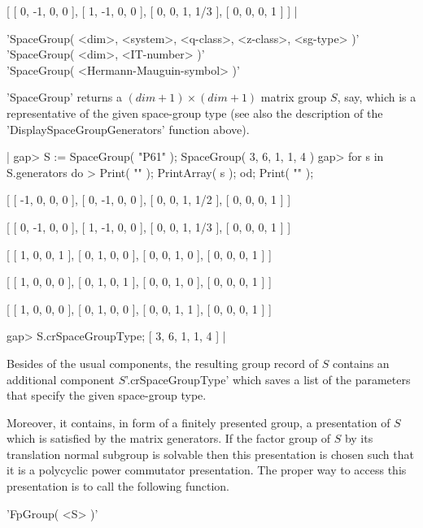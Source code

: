     [ [    0,   -1,    0,    0 ],
      [    1,   -1,    0,    0 ],
      [    0,    0,    1,  1/3 ],
      [    0,    0,    0,    1 ] ] |

\vspace{5mm}
'SpaceGroup( <dim>, <system>, <q-class>, <z-class>, <sg-type> )'%
 \\
'SpaceGroup( <dim>, <IT-number> )' \\
'SpaceGroup( <Hermann-Mauguin-symbol> )'

'SpaceGroup' returns a  $(dim+1) \times (dim+1  )$ matrix group $S$, say,
which is a  representative of the given   space-group type (see also  the
description of the 'DisplaySpaceGroupGenerators' function above).

|    gap> S := SpaceGroup( "P61" );
    SpaceGroup( 3, 6, 1, 1, 4 )
    gap> for s in S.generators do
    >  Print( "\n" ); PrintArray( s ); od; Print( "\n" );

    [ [   -1,    0,    0,    0 ],
      [    0,   -1,    0,    0 ],
      [    0,    0,    1,  1/2 ],
      [    0,    0,    0,    1 ] ]

    [ [    0,   -1,    0,    0 ],
      [    1,   -1,    0,    0 ],
      [    0,    0,    1,  1/3 ],
      [    0,    0,    0,    1 ] ]

    [ [  1,  0,  0,  1 ],
      [  0,  1,  0,  0 ],
      [  0,  0,  1,  0 ],
      [  0,  0,  0,  1 ] ]

    [ [  1,  0,  0,  0 ],
      [  0,  1,  0,  1 ],
      [  0,  0,  1,  0 ],
      [  0,  0,  0,  1 ] ]

    [ [  1,  0,  0,  0 ],
      [  0,  1,  0,  0 ],
      [  0,  0,  1,  1 ],
      [  0,  0,  0,  1 ] ]

    gap> S.crSpaceGroupType;
    [ 3, 6, 1, 1, 4 ] |

Besides  of  the usual components,   the  resulting group  record of  $S$
contains an additional component   $S$'.crSpaceGroupType' which saves   a
list of the parameters that specify the given space-group type.

Moreover, it  contains,   in  form  of a  finitely  presented  group,   a
presentation of $S$  which is satisfied  by the matrix generators. If the
factor group  of $S$ by its translation  normal subgroup is solvable then
this presentation is chosen such that it is a polycyclic power commutator
presentation. The proper way to  access this presentation  is to call the
following function.

\vspace{5mm}
'FpGroup( <S> )'%

